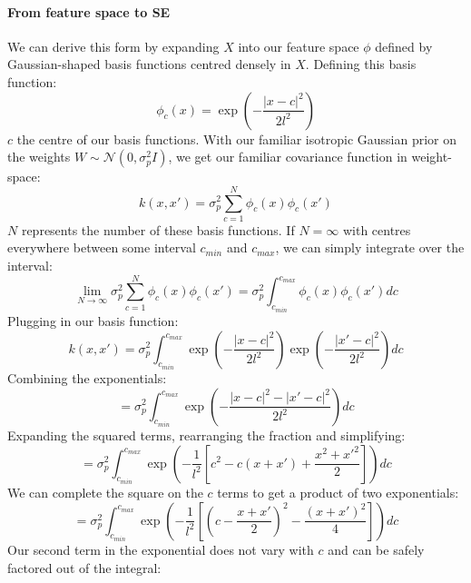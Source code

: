 \paragraph{From feature space to SE}
We can derive this form by expanding $X$ into our feature space $\phi$ defined by Gaussian-shaped basis functions centred densely in $X$. Defining this basis function:
\begin{equation*}
    \phi_c(x) = \exp \left(- \frac{|x - c|^2}{2l^2} \right)
\end{equation*}
$c$ the centre of our basis functions. With our familiar isotropic Gaussian prior on the weights $W \sim \mathcal{N}(0, \sigma^2_pI)$, we get our familiar covariance function in weight-space:
\begin{equation*}
    k(x, x') = \sigma_p^2 \sum_{c=1}^N \phi_c(x) \phi_c(x') 
\end{equation*}
$N$ represents the number of these basis functions. If $N = \infty$ with centres everywhere between some interval $c_{min}$ and $c_{max}$, we can simply integrate over the interval:
\begin{equation*}
    \lim_{N \to \infty} \sigma_p^2 \sum_{c=1}^N \phi_c(x) \phi_c(x') = \sigma_p^2 \int_{c_{min}}^{c_{max}} \phi_c(x) \phi_c(x') dc
\end{equation*}
Plugging in our basis function:
\begin{equation*}
    k(x, x') = \sigma_p^2 \int_{c_{min}}^{c_{max}} \exp \left(- \frac{|x - c|^2}{2l^2} \right) \exp \left(- \frac{|x' - c|^2}{2l^2} \right) dc
\end{equation*}
Combining the exponentials:
\begin{equation*}
    = \sigma_p^2 \int_{c_{min}}^{c_{max}} \exp \left(- \frac{|x - c|^2 - |x' - c|^2}{2l^2} \right) dc
\end{equation*}
Expanding the squared terms, rearranging the fraction and simplifying:
\begin{equation*}
    = \sigma_p^2 \int_{c_{min}}^{c_{max}} \exp \left( -\frac{1}{l^2} \left[ c^2 - c(x + x') + \frac{x^2 + x'^2}{2} \right] \right) dc
\end{equation*}
We can complete the square on the $c$ terms to get a product of two exponentials:
\begin{equation*}
    = \sigma_p^2 \int_{c_{min}}^{c_{max}} \exp \left( -\frac{1}{l^2} \left[ (c - \frac{x + x'}{2})^2 - \frac{(x + x')^2}{4} \right] \right) dc
\end{equation*}
Our second term in the exponential does not vary with $c$ and can be safely factored out of the integral:
